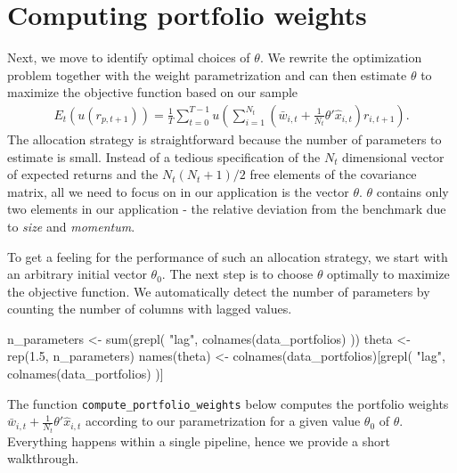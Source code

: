 \documentclass[
]{book}
\newenvironment{Shaded}{\begin{snugshade}}{\end{snugshade}}
\newcommand{\FloatTok}[1]{\textcolor[rgb]{0.06,0.06,0.06}{#1}}
\newcommand{\FunctionTok}[1]{\textcolor[rgb]{0,0,0}{#1}}
\newcommand{\NormalTok}[1]{#1}
\newcommand{\OtherTok}[1]{\textcolor[rgb]{0.37,0.37,0.37}{#1}}
\newcommand{\StringTok}[1]{\textcolor[rgb]{0.5,0.5,0.5}{#1}}
\begin{document}
\hypertarget{computing-portfolio-weights}{%
\section{Computing portfolio weights}\label{computing-portfolio-weights}}

Next, we move to identify optimal choices of \(\theta\). We rewrite the optimization problem together with the weight parametrization and can then estimate \(\theta\) to maximize the objective function based on our sample
\[\begin{aligned}
E_t\left(u(r_{p, t+1})\right) = \frac{1}{T}\sum\limits_{t=0}^{T-1}u\left(\sum\limits_{i=1}^{N_t}\left(\bar{w}_{i,t} + \frac{1}{N_t}\theta'\hat{x}_{i,t}\right)r_{i,t+1}\right).
\end{aligned}\]
The allocation strategy is straightforward because the number of parameters to estimate is small. Instead of a tedious specification of the \(N_t\) dimensional vector of expected returns and the \(N_t(N_t+1)/2\) free elements of the covariance matrix, all we need to focus on in our application is the vector \(\theta\). \(\theta\) contains only two elements in our application - the relative deviation from the benchmark due to \emph{size} and \emph{momentum}.

To get a feeling for the performance of such an allocation strategy, we start with an arbitrary initial vector \(\theta_0\). The next step is to choose \(\theta\) optimally to maximize the objective function. We automatically detect the number of parameters by counting the number of columns with lagged values.

\begin{Shaded}
\begin{Highlighting}[]
\NormalTok{n\_parameters }\OtherTok{\textless{}{-}} \FunctionTok{sum}\NormalTok{(}\FunctionTok{grepl}\NormalTok{(}
  \StringTok{"lag"}\NormalTok{,}
  \FunctionTok{colnames}\NormalTok{(data\_portfolios)}
\NormalTok{))}
\NormalTok{theta }\OtherTok{\textless{}{-}} \FunctionTok{rep}\NormalTok{(}\FloatTok{1.5}\NormalTok{, n\_parameters)}
\FunctionTok{names}\NormalTok{(theta) }\OtherTok{\textless{}{-}} \FunctionTok{colnames}\NormalTok{(data\_portfolios)[}\FunctionTok{grepl}\NormalTok{(}
  \StringTok{"lag"}\NormalTok{,}
  \FunctionTok{colnames}\NormalTok{(data\_portfolios)}
\NormalTok{)]}
\end{Highlighting}
\end{Shaded}

The function \texttt{compute\_portfolio\_weights} below computes the portfolio weights \(\bar{w}_{i,t} + \frac{1}{N_t}\theta'\hat{x}_{i,t}\) according to our parametrization for a given value \(\theta_0\) of \(\theta\). Everything happens within a single pipeline, hence we provide a short walkthrough.
\end{document}

